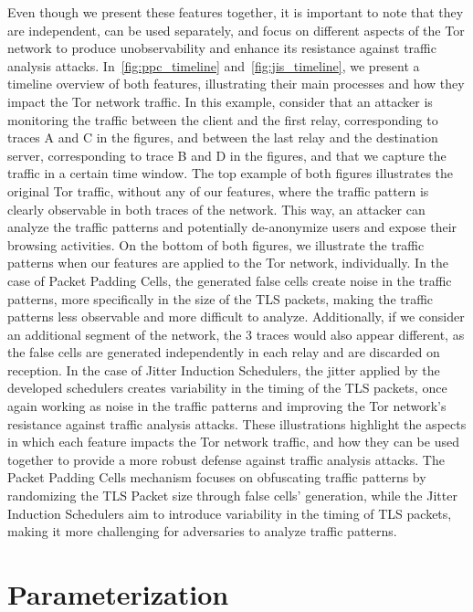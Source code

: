 Even though we present these features together, it is important to note that they are independent, can be used separately, and focus on different aspects of the Tor network to produce unobservability and enhance its resistance against traffic analysis attacks. In~\autoref{fig:ppc_timeline} and~\autoref{fig:jis_timeline}, we present a timeline overview of both features, illustrating their main processes and how they impact the Tor network traffic. In this example, consider that an attacker is monitoring the traffic between the client and the first relay, corresponding to traces A and C in the figures, and between the last relay and the destination server, corresponding to trace B and D in the figures, and that we capture the traffic in a certain time window. The top example of both figures illustrates the original Tor traffic, without any of our features, where the traffic pattern is clearly observable in both traces of the network. This way, an attacker can analyze the traffic patterns and potentially de-anonymize users and expose their browsing activities. On the bottom of both figures, we illustrate the traffic patterns when our features are applied to the Tor network, individually. In the case of Packet Padding Cells, the generated false cells create noise in the traffic patterns, more specifically in the size of the TLS packets, making the traffic patterns less observable and more difficult to analyze. Additionally, if we consider an additional segment of the network, the 3 traces would also appear different, as the false cells are generated independently in each relay and are discarded on reception. In the case of Jitter Induction Schedulers, the jitter applied by the developed schedulers creates variability in the timing of the TLS packets, once again working as noise in the traffic patterns and improving the Tor network's resistance against traffic analysis attacks.
These illustrations highlight the aspects in which each feature impacts the Tor network traffic, and how they can be used together to provide a more robust defense against traffic analysis attacks. The Packet Padding Cells mechanism focuses on obfuscating traffic patterns by randomizing the TLS Packet size through false cells' generation, while the Jitter Induction Schedulers aim to introduce variability in the timing of TLS packets, making it more challenging for adversaries to analyze traffic patterns.

\section{Parameterization}\label{sec:parameterization}

